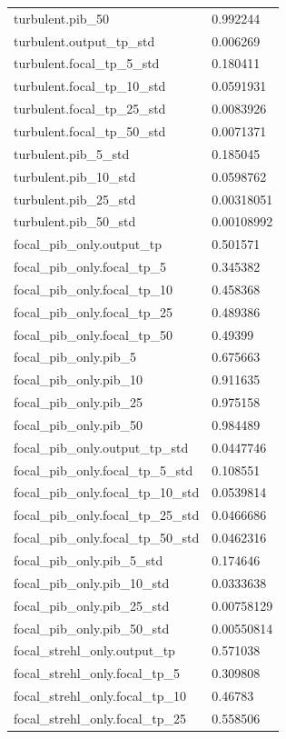 \begin{longtable}{p{}p{}}
turbulent.pib\_50 & 0.992244\\
turbulent.output\_tp\_std & 0.006269\\
turbulent.focal\_tp\_5\_std & 0.180411\\
turbulent.focal\_tp\_10\_std & 0.0591931\\
turbulent.focal\_tp\_25\_std & 0.0083926\\
turbulent.focal\_tp\_50\_std & 0.0071371\\
turbulent.pib\_5\_std & 0.185045\\
turbulent.pib\_10\_std & 0.0598762\\
turbulent.pib\_25\_std & 0.00318051\\
turbulent.pib\_50\_std & 0.00108992\\
focal\_pib\_only.output\_tp & 0.501571\\
focal\_pib\_only.focal\_tp\_5 & 0.345382\\
focal\_pib\_only.focal\_tp\_10 & 0.458368\\
focal\_pib\_only.focal\_tp\_25 & 0.489386\\
focal\_pib\_only.focal\_tp\_50 & 0.49399\\
focal\_pib\_only.pib\_5 & 0.675663\\
focal\_pib\_only.pib\_10 & 0.911635\\
focal\_pib\_only.pib\_25 & 0.975158\\
focal\_pib\_only.pib\_50 & 0.984489\\
focal\_pib\_only.output\_tp\_std & 0.0447746\\
focal\_pib\_only.focal\_tp\_5\_std & 0.108551\\
focal\_pib\_only.focal\_tp\_10\_std & 0.0539814\\
focal\_pib\_only.focal\_tp\_25\_std & 0.0466686\\
focal\_pib\_only.focal\_tp\_50\_std & 0.0462316\\
focal\_pib\_only.pib\_5\_std & 0.174646\\
focal\_pib\_only.pib\_10\_std & 0.0333638\\
focal\_pib\_only.pib\_25\_std & 0.00758129\\
focal\_pib\_only.pib\_50\_std & 0.00550814\\
focal\_strehl\_only.output\_tp & 0.571038\\
focal\_strehl\_only.focal\_tp\_5 & 0.309808\\
focal\_strehl\_only.focal\_tp\_10 & 0.46783\\
focal\_strehl\_only.focal\_tp\_25 & 0.558506\\

\end{longtable}
